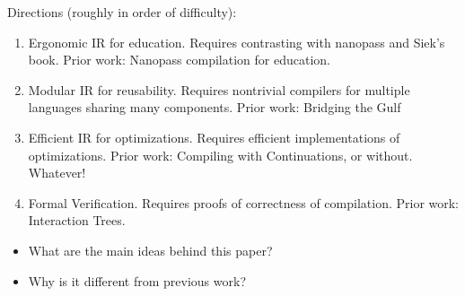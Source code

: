 \documentclass[sigplan,anonymous,review]{acmart}
\begin{document}
% 

Directions (roughly in order of difficulty):
\begin{enumerate}
  \item Ergonomic IR for education. Requires contrasting with nanopass and Siek's book. Prior work: Nanopass compilation for education.
  \item Modular IR for reusability. Requires nontrivial compilers for multiple languages sharing many components. Prior work: Bridging the Gulf
  \item Efficient IR for optimizations. Requires efficient implementations of optimizations. Prior work: Compiling with Continuations, or without. Whatever!
  \item Formal Verification. Requires proofs of correctness of compilation. Prior work: Interaction Trees.
\end{enumerate}

\begin{itemize}
  \item What are the main ideas behind this paper?
  \item Why is it different from previous work?
\end{itemize}
\end{document}
